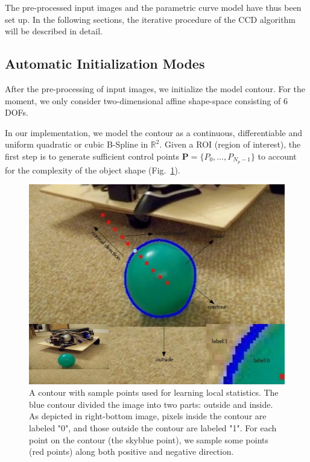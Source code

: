 \documentclass[conference]{IEEEtran}
\begin{document}
The pre-processed input images and the parametric curve model have
thus been set up. In the following sections, the iterative procedure of the
CCD algorithm will be described in detail.

\subsection{Automatic Initialization Modes}

After the pre-processing of input images,  we initialize the model contour. For the moment, we only consider two-dimensional
affine shape-space consisting of 6 DOFs. %

In our implementation, we model the
contour as a continuous, differentiable and uniform quadratic or cubic
B-Spline in $\mathbb{R}^2$.
Given a ROI (region of interest), the first step is to generate
sufficient control points $\mathbf{P} = \{P_0, \ldots, P_{N_p-1}\}$ to
account for the complexity of the object shape (Fig.~\ref{fig:prior}).

\begin{figure}[htb]
  \centering
  \includegraphics[width=\columnwidth]{images/cont.jpg}
\caption{A contour with sample points used for learning local statistics. The blue contour
  divided the image into two parts: outside and inside. As depicted in
  right-bottom image, pixels inside the contour are labeled "0",
  and those outside the contour are labeled "1". For each point on the
  contour (the skyblue point), we sample some points (red points) along both positive
  and negative direction.}
\label{fig:prior}
\end{figure}
\end{document}
